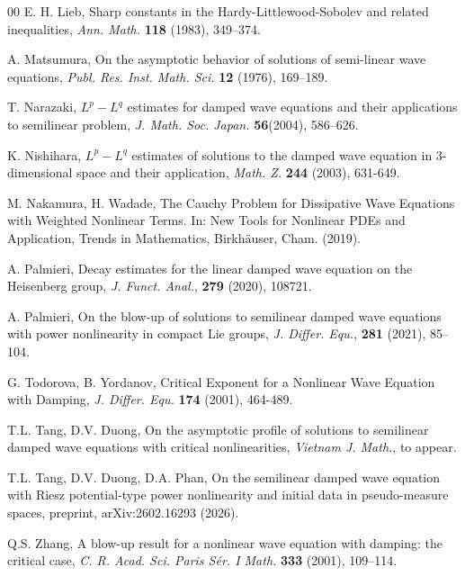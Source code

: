 \documentclass[11pt,reqno]{amsart}
\begin{document}
\begin{thebibliography}{00}
 E. H. Lieb, Sharp constants in the Hardy-Littlewood-Sobolev and related inequalities, \textit{Ann. Math.} \textbf{118} (1983), 349–374.


 A. Matsumura, On the asymptotic behavior of solutions of semi-linear wave equations, \textit{Publ. Res. Inst. Math. Sci.} \textbf{12} (1976), 169–189. 







 T. Narazaki, $L^p-L^q$ estimates for damped wave equations and their applications to semilinear problem, \textit{J. Math. Soc. Japan. } \textbf{56}(2004),  586–626.




 K. Nishihara, $L^p-L^q$ estimates of solutions to the damped wave
equation in $3$-dimensional space and their application, \textit{Math. Z.} \textbf{244} 
  (2003), 631-649.

 M. Nakamura, H. Wadade, The Cauchy Problem for Dissipative Wave Equations with Weighted Nonlinear Terms. In: New Tools for Nonlinear PDEs and Application, Trends in Mathematics, Birkhäuser, Cham. (2019).




 A. Palmieri, Decay estimates for the linear damped wave equation on the Heisenberg group, \textit{J.
Funct. Anal.}, \textbf{279} (2020), 108721.

 A. Palmieri, On the blow-up of solutions to semilinear damped wave equations with power nonlinearity in compact Lie groups, \textit{J. Differ. Equ.}, \textbf{281} (2021), 85–104.



 G. Todorova, B. Yordanov, Critical Exponent for a Nonlinear Wave Equation with Damping, \textit{J. Differ. Equ.} \textbf{174} (2001), 464-489.

 T.L. Tang, D.V. Duong, On the asymptotic profile of solutions to semilinear damped wave equations with critical
nonlinearities, \textit{Vietnam J. Math.}, to appear.

 T.L. Tang, D.V. Duong, D.A. Phan, On the semilinear damped wave equation with Riesz potential-type power
nonlinearity and initial data in pseudo-measure spaces, preprint, arXiv:2602.16293 (2026).

 Q.S. Zhang, A blow-up result for a nonlinear wave equation with damping: the critical case, \textit{C. R.
Acad. Sci. Paris Sér. I Math. } \textbf{333} (2001),  109–114.
\end{thebibliography}
\end{document}
